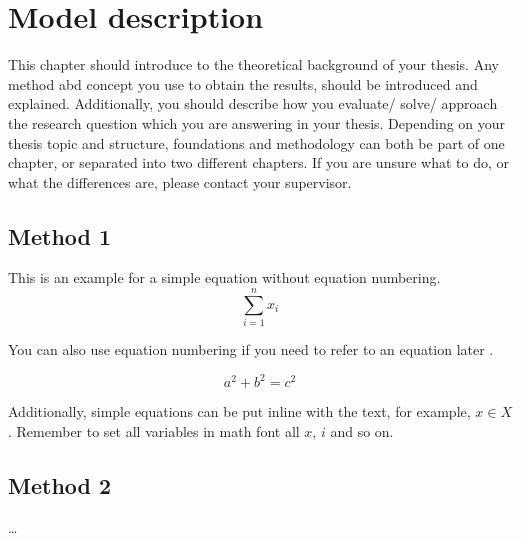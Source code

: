 \chapter{Model description}
\label{ch:model-description}

This chapter should introduce to the theoretical background of your thesis. Any method abd concept you use to obtain the results, should be introduced and explained. Additionally, you should describe how you evaluate/ solve/ approach the research question which you are answering in your thesis. Depending on your thesis topic and structure, foundations and methodology can both be part of one chapter, or separated into two different chapters. If you are unsure what to do, or what the differences are, please contact your supervisor.

\section{Method 1}

This is an example for a simple equation without equation numbering.
$$
\sum\limits_{i=1}^{n}{x_i}
$$

You can also use equation numbering if you need to refer to an equation later \eg {}.


\begin{equation}
a^2 + b^2 = c^2
\label{eq:ex1}
\end{equation}

Additionally, simple equations can be put inline with the text, for example, $x \in X$. Remember to set all variables in math font \ie all $x$, $i$ and so on.

\section{Method 2}

\dots

\newpage



